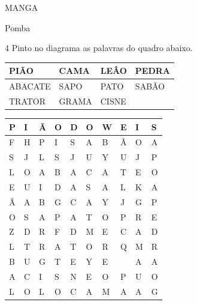 MANGA

Pomba


\num{4} Pinto no diagrama as palavras do quadro abaixo.


\begin{longtable}[]{@{}llll@{}}
\toprule
PIÃO & CAMA & LEÂO & PEDRA\tabularnewline
\midrule
\endhead
ABACATE & SAPO & PATO & SABÃO\tabularnewline
TRATOR & GRAMA & CISNE\tabularnewline
\bottomrule
\end{longtable}

\begin{longtable}[]{@{}llllllllll@{}}
\toprule
P & I & Ã & O & D & O & W & E & I & S\tabularnewline
\midrule
\endhead
F & H & P & I & S & A & B & Ã & O & A\tabularnewline
S & J & L & S & J & U & Y & U & J & P\tabularnewline
L & O & A & B & A & C & A & T & E & O\tabularnewline
E & U & I & D & A & S & A & L & K & A\tabularnewline
Ã & A & B & G & C & A & Y & J & G & P\tabularnewline
O & S & A & P & A & T & O & P & R & E\tabularnewline
Z & D & R & F & D & M & E & C & A & D\tabularnewline
L & T & R & A & T & O & R & Q & M & R\tabularnewline
B & U & G & T & E & Y & E & & A & A\tabularnewline
A & C & I & S & N & E & O & P & U & O\tabularnewline
L & O & L & O & C & A & M & A & A & G\tabularnewline
\bottomrule
\end{longtable}

